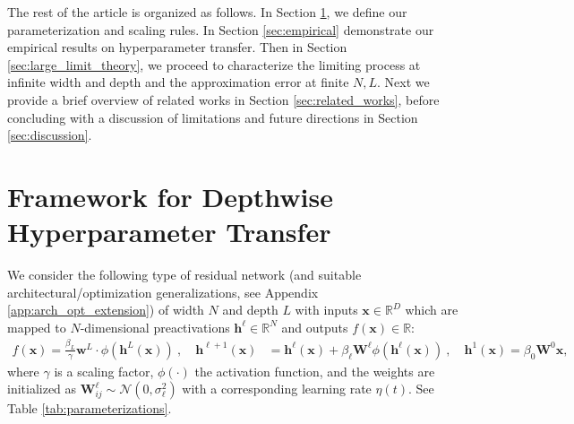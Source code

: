 \documentclass{article} %
\def\h{\bm h}
\def\x{\bm x}
\def\w{\bm w}
\def\W{\bm W}
\begin{document}
The rest of the article is organized as follows. In Section \ref{sec:framework}, we define our parameterization and scaling rules. In Section \ref{sec:empirical} demonstrate our empirical results on hyperparameter transfer. 
% 
Then in Section \ref{sec:large_limit_theory}, we proceed to characterize the limiting process at infinite width and depth and the approximation error at finite $N,L$. 
% 
Next we provide a brief overview of related works in Section \ref{sec:related_works}, before concluding with a discussion of limitations and future directions in Section \ref{sec:discussion}. 
% 


\section{Framework for Depthwise Hyperparameter Transfer}
\label{sec:framework}

We consider the following type of residual network (and suitable architectural/optimization generalizations, see Appendix \ref{app:arch_opt_extension}) of width $N$ and depth $L$ with inputs $\x \in \mathbb{R}^D$ which are mapped to $N$-dimensional preactivations $\h^\ell \in \mathbb{R}^N$ and outputs $f(\x) \in \mathbb{R}$:
\begin{align}
\label{eq:res-model}
    f(\x) = \frac{\beta_L}{\gamma} \w^L \cdot \phi(\h^L(\x)) \ , \quad 
    \h^{\ell+1}(\x) &=  \h^{\ell}(\x) +   \beta_\ell \W^\ell \phi(\h^\ell(\x))  
    \ , \quad \h^{1}(\x) = \beta_0 \W^0 \x ,
\end{align}
where $\gamma$ is a scaling factor, $\phi(\cdot)$ the activation function, and the weights are initialized as $\W^\ell_{ij}\sim\mathcal{N}(0,\sigma_\ell^2)$ with a corresponding learning rate $\eta(t)$. See Table \ref{tab:parameterizations}.
\end{document}
